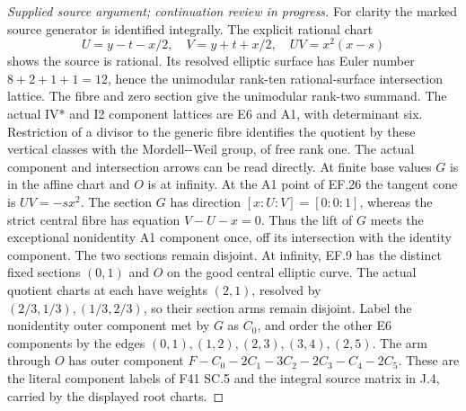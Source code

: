 \begin{proof}[Supplied source argument; continuation review in progress]
For clarity the marked source generator is identified integrally.
The explicit rational chart
\[
 U=y-t-x/2,\quad V=y+t+x/2,\quad UV=x^2(x-s)
 \tag{EF.26}
\]
shows the source is rational. Its resolved elliptic surface has Euler
number \(8+2+1+1=12\), hence the unimodular rank-ten rational-surface
intersection lattice. The fibre and zero section give the unimodular
rank-two summand. The actual IV* and I2 component lattices are E6 and
A1, with determinant six. Restriction of a divisor to the generic
fibre identifies the quotient by these vertical classes with the
Mordell-\/-Weil group, of free rank one. The actual component and
intersection arrows can be read directly. At finite base values \(G\)
is in the affine chart and \(O\) is at infinity. At the A1 point of
EF.26 the tangent cone is \(UV=-s x^2\). The section \(G\) has direction
\([x:U:V]=[0:0:1]\), whereas the strict central fibre has equation
\(V-U-x=0\). Thus the lift of \(G\) meets the exceptional nonidentity
A1 component once, off its intersection with the identity component.
The two sections remain disjoint. At infinity, EF.9 has the distinct
fixed sections \((0,1)\) and \(O\) on the good central elliptic curve.
The actual quotient charts at each have weights \((2,1)\), resolved
by \((2/3,1/3),(1/3,2/3)\), so their section arms remain disjoint.
Label the nonidentity outer component met by \(G\) as \(C_0\), and
order the other E6 components by the edges
\((0,1),(1,2),(2,3),(3,4),(2,5)\). The arm through \(O\) has outer
component \(F-C_0-2C_1-3C_2-2C_3-C_4-2C_5\).
These are the literal component labels of F41 SC.5 and the integral
source matrix in J.4, carried by the displayed root charts.


\end{proof}
